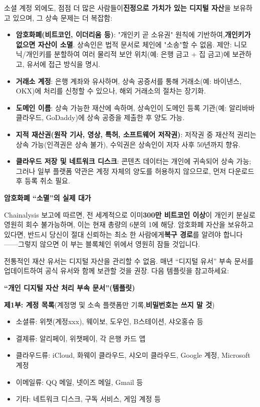 
소셜 계정 외에도, 점점 더 많은 사람들이\textbf{진정으로 가치가 있는 디지털 자산}을 보유하고 있으며, 그 상속 문제는 더 복잡함:

\begin{itemize}
  \item \textbf{암호화폐(비트코인, 이더리움 등)}: "개인키 곧 소유권" 원칙에 기반하여,\textbf{개인키가 없으면 자산이 소멸}. 상속인은 법적 문서로 체인에 "소송"할 수 없음. 제안: 니모닉/개인키를 분할하여 여러 물리적 보안 위치(예: 은행 금고 + 집 금고)에 보관하고, 유서에 접근 방식을 명시.
  \item \textbf{거래소 계정}: 은행 계좌와 유사하며, 상속 공증서를 통해 거래소(예: 바이낸스, OKX)에 처리를 신청할 수 있으나, 해외 거래소의 절차는 장기화.
  \item \textbf{도메인 이름}: 상속 가능한 재산에 속하며, 상속인이 도메인 등록 기관(예: 알리바바 클라우드, GoDaddy)에 상속 공증을 제출한 후 양도 가능.
  \item \textbf{지적 재산권(원작 기사, 영상, 특허, 소프트웨어 저작권)}: 저작권 중 재산적 권리는 상속 가능(인격권은 상속 불가), 수익권은 상속인이 저자 사후 50년까지 향유.
  \item \textbf{클라우드 저장 및 네트워크 디스크}: 콘텐츠 데이터는 개인에 귀속되어 상속 가능; 그러나 일부 플랫폼 약관은 계정 자체의 양도를 허용하지 않으므로, 먼저 다운로드 후 등록 취소 필요.
\end{itemize}

\textbf{암호화폐 “소멸”의 실제 대가}\par

Chainalysis 보고에 따르면, 전 세계적으로 이미\textbf{300만 비트코인 이상}이 개인키 분실로 영원히 회수 불가능하며, 이는 현재 총량의 6분의 1에 해당. 암호화폐 자산을 보유하고 있다면, 반드시 당신이 절대 신뢰하는 최소 한 사람에게\textbf{복구 경로}를 알려야 합니다——그렇지 않으면 이 부는 블록체인 위에서 영원히 잠들 것입니다.


전통적인 재산 유서는 디지털 자산을 관리할 수 없음. 매년 “디지털 유서” 부속 문서를 업데이트하여 공식 유서와 함께 보관할 것을 권장. 다음 템플릿을 참고하세요:

\textbf{“개인 디지털 자산 처리 부속 문서”(템플릿)}\par

\textbf{제1부: 계정 목록}(계정명 및 소속 플랫폼만 기록,\textbf{비밀번호는 쓰지 말 것})

\begin{itemize}
  \item 소셜류: 위챗(계정xxx), 웨이보, 도우인, B스테이션, 샤오홍슈 등
  \item 결제류: 알리페이, 위챗페이, 각 은행 카드 앱
  \item 클라우드류: iCloud, 화웨이 클라우드, 샤오미 클라우드, Google 계정, Microsoft 계정
  \item 이메일류: QQ 메일, 넷이즈 메일, Gmail 등
  \item 기타: 네트워크 디스크, 구독 서비스, 게임 계정 등
\end{itemize}

